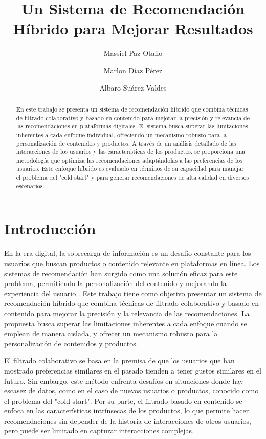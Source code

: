 \documentclass{llncs}
\begin{document}
\title{Un Sistema de Recomendación Híbrido para Mejorar Resultados}
\author{Massiel Paz Otaño \and Marlon Díaz Pérez \and Albaro Suárez Valdes}

\maketitle

\begin{abstract}
En este trabajo se presenta un sistema de recomendación híbrido que combina técnicas de filtrado colaborativo y basado en contenido para mejorar la precisión y relevancia de las recomendaciones en plataformas digitales. El sistema busca superar las limitaciones inherentes a cada enfoque individual, ofreciendo un mecanismo robusto para la personalización de contenidos y productos. A través de un análisis detallado de las interacciones de los usuarios y las características de los productos, se proporciona una metodología que optimiza las recomendaciones adaptándolas a las preferencias de los usuarios. Este enfoque híbrido es evaluado en términos de su capacidad para manejar el problema del "cold start" y para generar recomendaciones de alta calidad en diversos escenarios.
\end{abstract}

\section{Introducción}
En la era digital, la sobrecarga de información es un desafío constante para los usuarios que buscan productos o contenido relevante en plataformas en línea. Los sistemas de recomendación han surgido como una solución eficaz para este problema, permitiendo la personalización del contenido y mejorando la experiencia del usuario \cite{video}. Este trabajo tiene como objetivo presentar un sistema de recomendación híbrido que combina técnicas de filtrado colaborativo y basado en contenido para mejorar la precisión y la relevancia de las recomendaciones. La propuesta busca superar las limitaciones inherentes a cada enfoque cuando se emplean de manera aislada, y ofrecer un mecanismo robusto para la personalización de contenidos y productos.

El filtrado colaborativo se basa en la premisa de que los usuarios que han mostrado preferencias similares en el pasado tienden a tener gustos similares en el futuro. Sin embargo, este método enfrenta desafíos en situaciones donde hay escasez de datos, como en el caso de nuevos usuarios o productos, conocido como el problema del "cold start". Por su parte, el filtrado basado en contenido se enfoca en las características intrínsecas de los productos, lo que permite hacer recomendaciones sin depender de la historia de interacciones de otros usuarios, pero puede ser limitado en capturar interacciones complejas.
\end{document}
